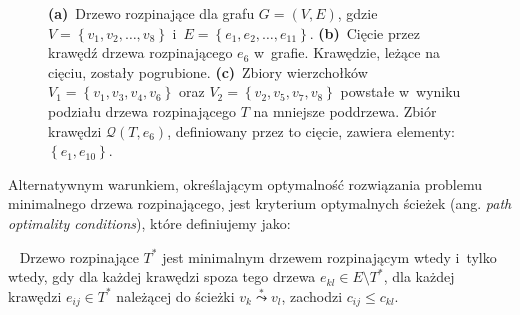 \begin{figure}[!htbp]
\begin{subfigure}[b]{0.3\textwidth}
		\caption{}
		\label{fig:cut:c}
	\end{subfigure}
	\hfill\null
	\caption{
		\textbf{(a)}~Drzewo rozpinające dla grafu $G = \left( V, E \right)$, gdzie $V = \left\{ v_{1}, v_{2}, \dots, v_{8} \right\}$ i~$E = \left\{ e_{1}, e_{2}, \dots, e_{11} \right\}$.
		\textbf{(b)}~Cięcie przez krawędź drzewa rozpinającego $e_{6}$ w~grafie.
		Krawędzie, leżące na cięciu, zostały pogrubione.
		\textbf{(c)}~Zbiory wierzchołków $V_{1} = \left\{ v_{1}, v_{3}, v_{4}, v_{6} \right\}$ oraz $V_{2} = \left\{ v_{2}, v_{5}, v_{7}, v_{8} \right\}$ powstałe w~wyniku podziału drzewa rozpinającego $T$ na mniejsze poddrzewa.
		Zbiór krawędzi $\mathcal{Q} \left( T, e_{6} \right)$, definiowany przez to cięcie, zawiera elementy: $\left\{ e_{1}, e_{10} \right\}$.
	}
	\label{fig:cut}
\end{figure}

Alternatywnym warunkiem, określającym optymalność rozwiązania problemu minimalnego drzewa rozpinającego, jest kryterium optymalnych ścieżek (ang. \textit{path optimality conditions}), które definiujemy jako:

\begin{theorem}\label{def:optpath}~\cite[$519$]{Ahuja:1993:NFT:137406}
	Drzewo rozpinające $T^{\ast}$ jest minimalnym drzewem rozpinającym wtedy i~tylko wtedy, gdy dla każdej krawędzi spoza tego drzewa $e_{kl} \in E \setminus T^{\ast}$, dla każdej krawędzi $e_{ij} \in T^{\ast}$ należącej do ścieżki $v_{k} \overset{\ast}{\leadsto} v_{l}$, zachodzi $c_{ij} \leqslant c_{kl}$.
\end{theorem}

